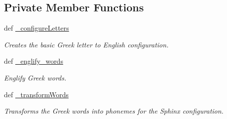 \subsection*{Private Member Functions}
\begin{DoxyCompactItemize}
\item 
def \hyperlink{classrapp__speech__detection__sphinx4_1_1greek__support_1_1GreekSupport_ac5823a37a949ba4bf9669906913e064b}{\-\_\-configure\-Letters}
\begin{DoxyCompactList}\small\item\em Creates the basic Greek letter to English configuration. \end{DoxyCompactList}\item 
def \hyperlink{classrapp__speech__detection__sphinx4_1_1greek__support_1_1GreekSupport_a26445e371062313c7e1a7a04562a3bf7}{\-\_\-englify\-\_\-words}
\begin{DoxyCompactList}\small\item\em Englify Greek words. \end{DoxyCompactList}\item 
def \hyperlink{classrapp__speech__detection__sphinx4_1_1greek__support_1_1GreekSupport_ac7e3b9ebc81d7c52b0892edf79ae5edc}{\-\_\-transform\-Words}
\begin{DoxyCompactList}\small\item\em Transforms the Greek words into phonemes for the Sphinx configuration. \end{DoxyCompactList}\end{DoxyCompactItemize}
